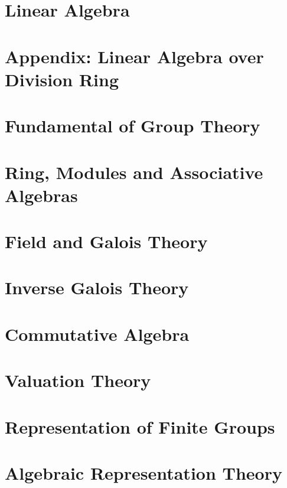 \documentclass{ModulEN}
\begin{document}
	\part{Linear Algebra}
	
		
		
	\part{Appendix: Linear Algebra over Division Ring}
	
		
		
		
	
	\part{Fundamental of Group Theory}
	
	\part{Ring, Modules and Associative Algebras}
	
		
	
	\part{Field and Galois Theory}
		
	
	
	\part{Inverse Galois Theory}
		
	\part{Commutative Algebra}
	
		
	\part{Valuation Theory}
		
		
	\part{Representation of Finite Groups}
		
	\part{Algebraic Representation Theory}
		
	
\end{document}
